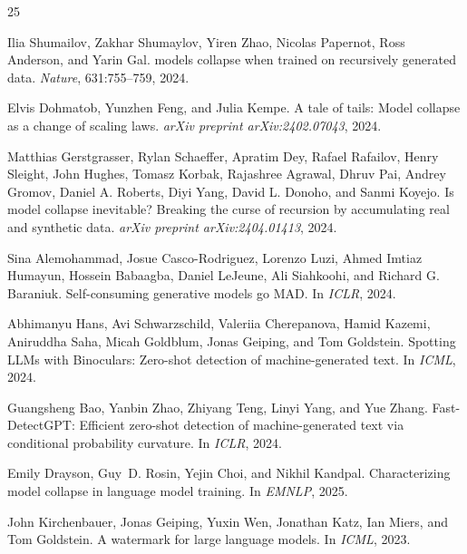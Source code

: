 \documentclass[11pt,a4paper]{article}
\begin{document}
\begin{thebibliography}{25}

Ilia Shumailov, Zakhar Shumaylov, Yiren Zhao, Nicolas Papernot, Ross Anderson, and Yarin Gal.
 models collapse when trained on recursively generated data.
\newblock \emph{Nature}, 631:755--759, 2024.

Elvis Dohmatob, Yunzhen Feng, and Julia Kempe.
\newblock A tale of tails: Model collapse as a change of scaling laws.
\newblock \emph{arXiv preprint arXiv:2402.07043}, 2024.

Matthias Gerstgrasser, Rylan Schaeffer, Apratim Dey, Rafael Rafailov, Henry Sleight, John Hughes, Tomasz Korbak, Rajashree Agrawal, Dhruv Pai, Andrey Gromov, Daniel A. Roberts, Diyi Yang, David L. Donoho, and Sanmi Koyejo.
\newblock Is model collapse inevitable? {B}reaking the curse of recursion by accumulating real and synthetic data.
\newblock \emph{arXiv preprint arXiv:2404.01413}, 2024.

Sina Alemohammad, Josue Casco-Rodriguez, Lorenzo Luzi, Ahmed Imtiaz Humayun, Hossein Babaagba, Daniel LeJeune, Ali Siahkoohi, and Richard G. Baraniuk.
\newblock Self-consuming generative models go {MAD}.
\newblock In \emph{ICLR}, 2024.

Abhimanyu Hans, Avi Schwarzschild, Valeriia Cherepanova, Hamid Kazemi, Aniruddha Saha, Micah Goldblum, Jonas Geiping, and Tom Goldstein.
\newblock Spotting {LLM}s with {B}inoculars: Zero-shot detection of machine-generated text.
\newblock In \emph{ICML}, 2024.

Guangsheng Bao, Yanbin Zhao, Zhiyang Teng, Linyi Yang, and Yue Zhang.
\newblock Fast-{D}etect{GPT}: Efficient zero-shot detection of machine-generated text via conditional probability curvature.
\newblock In \emph{ICLR}, 2024.

Emily Drayson, Guy~D. Rosin, Yejin Choi, and Nikhil Kandpal.
\newblock Characterizing model collapse in language model training.
\newblock In \emph{EMNLP}, 2025.

John Kirchenbauer, Jonas Geiping, Yuxin Wen, Jonathan Katz, Ian Miers, and Tom Goldstein.
\newblock A watermark for large language models.
\newblock In \emph{ICML}, 2023.


\end{thebibliography}
\end{document}
